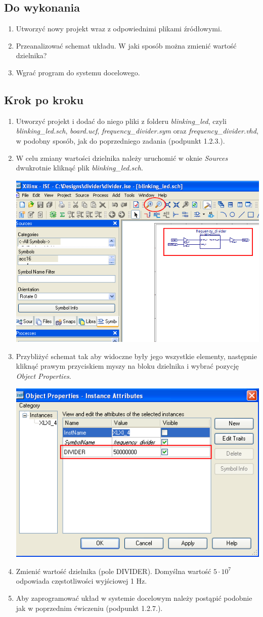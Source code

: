 \documentclass[12pt]{article}
\begin{document}
\subsection{Do wykonania}
\begin{enumerate}[wide, labelwidth=!, labelindent=0pt]	
\item Utworzyć nowy projekt wraz z odpowiednimi plikami źródłowymi.
\item Przeanalizować schemat układu. W jaki sposób można zmienić wartość dzielnika?
\item Wgrać program do systemu docelowego.
\end{enumerate}
\subsection{Krok po kroku}
\begin{enumerate}[wide, labelwidth=!, labelindent=0pt]	
\item Utworzyć projekt i dodać do niego pliki z folderu \textit{blinking\_led}, czyli \textit{blinking\_led.sch}, \textit{board.ucf}, \textit{frequency\_divider.sym} oraz \textit{frequency\_divider.vhd}, w podobny sposób, jak do poprzedniego zadania (podpunkt 1.2.3.).
\item W celu zmiany wartości dzielnika należy uruchomić w oknie \textit{Sources} dwukrotnie kliknąć plik \textit{blinking\_led.sch}.\\
\centerline{\includegraphics[width=0.5\linewidth]{2_1.png}}
\item Przybliżyć schemat tak aby widoczne były jego wszystkie elementy, następnie kliknąć prawym przyciskiem myszy na bloku dzielnika i wybrać pozycję \textit{Object Properties}.\\
\centerline{\includegraphics[width=0.5\linewidth]{2_2.png}}
\item Zmienić wartość dzielnika (pole DIVIDER). Domyślna wartość $5\cdot 10^{7}$ odpowiada częstotliwości wyjściowej 1 Hz.
\item Aby zaprogramować układ w systemie docelowym należy postąpić podobnie jak w poprzednim ćwiczeniu (podpunkt 1.2.7.).
\end{enumerate}
\end{document}
